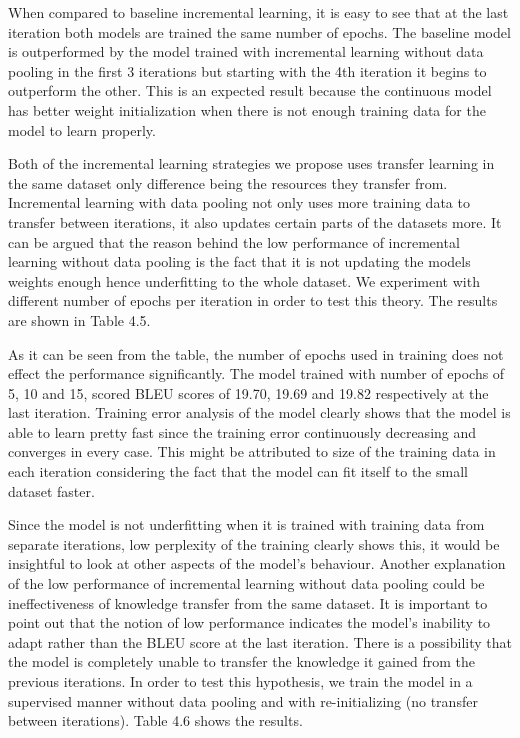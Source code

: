 When compared to baseline incremental learning, it is easy to see that at the last iteration both models are trained the same number of epochs. The baseline model is outperformed by the model trained with incremental learning without data pooling in the first 3 iterations but starting with the 4th iteration it begins to outperform the other. This is an expected result because the continuous model has better weight initialization when there is not enough training data for the model to learn properly.

Both of the incremental learning strategies we propose uses transfer learning in the same dataset only difference being the resources they transfer from. Incremental learning with data pooling not only uses more training data to transfer between iterations, it also updates certain parts of the datasets more. It can be argued that the reason behind the low performance of incremental learning without data pooling is the fact that it is not updating the models weights enough hence underfitting to the whole dataset. We experiment with different number of epochs per iteration in order to test this theory. The results are shown in Table 4.5.

As it can be seen from the table, the number of epochs used in training does not effect the performance significantly. The model trained with number of epochs of 5, 10 and 15, scored BLEU scores of 19.70, 19.69 and 19.82 respectively at the last iteration. Training error analysis of the model clearly shows that the model is able to learn pretty fast since the training error continuously decreasing and converges in every case. This might be attributed to size of the training data in each iteration considering the fact that the model can fit itself to the small dataset faster.

Since the model is not underfitting when it is trained with training data from separate iterations, low perplexity of the training clearly shows this, it would be insightful to look at other aspects of the model's behaviour. Another explanation of the low performance of incremental learning without data pooling could be ineffectiveness of knowledge transfer from the same dataset. It is important to point out that the notion of low performance indicates the model's inability to adapt rather than the BLEU score at the last iteration. There is a possibility that the model is completely unable to transfer the knowledge it gained from the previous iterations. In order to test this hypothesis, we train the model in a supervised manner without data pooling and with re-initializing (no transfer between iterations). Table 4.6 shows the results. 

